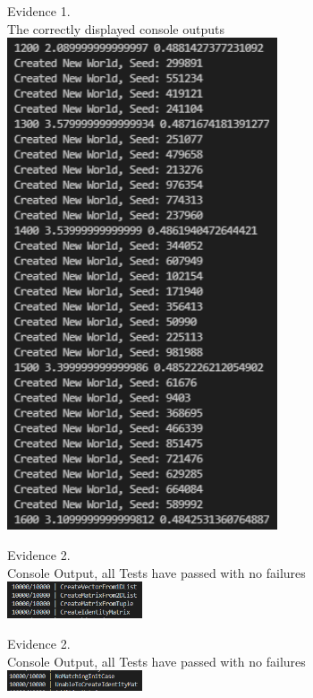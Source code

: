 \begin{flushleft}
\begin{center}
        {\large Evidence 1.\rn } \\ 
        \vspace{0.3cm}
        The correctly displayed console outputs \\
        \includegraphics[width=8cm]{Images/Testing/T1.10.1.PNG} \\
    \end{center}

    \setcounter{magicrownumbers}{0}
    \begin{center}
        {\large Evidence 2.\rn } \\ 
        \vspace{0.3cm}
        Console Output, all Tests have passed with no failures \\
        \includegraphics[width=4cm]{Images/Testing/T2.16.1.PNG} \\
        \vspace{1cm}

        {\large Evidence 2.\rn } \\ 
        \vspace{0.3cm}
        Console Output, all Tests have passed with no failures \\
        \includegraphics[width=4cm]{Images/Testing/T2.17.1.PNG} \\
        \vspace{1cm}


\end{center}
\end{flushleft}
